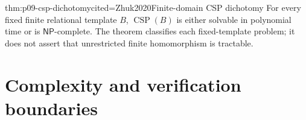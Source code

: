 \begin{hbtheorem}{thm:p09-csp-dichotomy}{cited=Zhuk2020}{Finite-domain CSP dichotomy}
For every fixed finite relational template \(B\),
\(\operatorname{CSP}(B)\) is either solvable in polynomial time or is
\(\mathsf{NP}\)-complete.  The theorem classifies each fixed-template problem;
it does not assert that unrestricted finite homomorphism is tractable.
\end{hbtheorem}






\section{Complexity and verification boundaries}
\label{sec:p09-complexity-boundaries}

